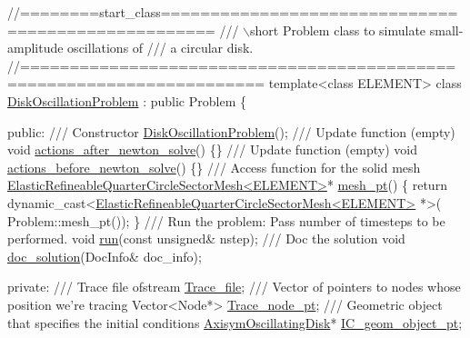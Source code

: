  
\begin{DoxyCodeInclude}
\textcolor{comment}{//========start\_class=================================================== }
\textcolor{comment}{/// \(\backslash\)short Problem class to simulate small-amplitude oscillations of }
\textcolor{comment}{}\textcolor{comment}{/// a circular disk.}
\textcolor{comment}{}\textcolor{comment}{//====================================================================== }
\textcolor{keyword}{template}<\textcolor{keyword}{class} ELEMENT>
\textcolor{keyword}{class }\hyperlink{classDiskOscillationProblem}{DiskOscillationProblem} : \textcolor{keyword}{public} Problem
\{

\textcolor{keyword}{public}:
\textcolor{comment}{}
\textcolor{comment}{ /// Constructor}
\textcolor{comment}{} \hyperlink{classDiskOscillationProblem_a5ce89d95d655d8c5b579171c8e9a54b9}{DiskOscillationProblem}();
\textcolor{comment}{}
\textcolor{comment}{ /// Update function (empty)}
\textcolor{comment}{} \textcolor{keywordtype}{void} \hyperlink{classDiskOscillationProblem_a84fdc4311e8cc1fa5f80dc5568c88413}{actions\_after\_newton\_solve}() \{\}
\textcolor{comment}{}
\textcolor{comment}{ /// Update function (empty)}
\textcolor{comment}{} \textcolor{keywordtype}{void} \hyperlink{classDiskOscillationProblem_afea297af1844657099dec3d717fcccc5}{actions\_before\_newton\_solve}() \{\}
\textcolor{comment}{}
\textcolor{comment}{ /// Access function for the solid mesh}
\textcolor{comment}{} \hyperlink{classElasticRefineableQuarterCircleSectorMesh}{ElasticRefineableQuarterCircleSectorMesh<ELEMENT>}* 
      \hyperlink{classDiskOscillationProblem_a9de851f400e5c161c5abf8efb2f2b082}{mesh\_pt}() 
  \{
   \textcolor{keywordflow}{return} \textcolor{keyword}{dynamic\_cast<}\hyperlink{classElasticRefineableQuarterCircleSectorMesh}{ElasticRefineableQuarterCircleSectorMesh<ELEMENT>}
      *\textcolor{keyword}{>}(
    Problem::mesh\_pt());
  \} 
\textcolor{comment}{}
\textcolor{comment}{ /// Run the problem: Pass number of timesteps to be performed.}
\textcolor{comment}{} \textcolor{keywordtype}{void} \hyperlink{classDiskOscillationProblem_ac0f7b36ffffa73ee49bc95bd961835dd}{run}(\textcolor{keyword}{const} \textcolor{keywordtype}{unsigned}& nstep);
 \textcolor{comment}{}
\textcolor{comment}{ /// Doc the solution}
\textcolor{comment}{} \textcolor{keywordtype}{void} \hyperlink{classDiskOscillationProblem_adf6e2bf1843d5f5e3fa7b2fc5fb129a8}{doc\_solution}(DocInfo& doc\_info);

\textcolor{keyword}{private}:
\textcolor{comment}{}
\textcolor{comment}{ /// Trace file}
\textcolor{comment}{} ofstream \hyperlink{classDiskOscillationProblem_a45a4b574c10c6416b3b6be950713f505}{Trace\_file};
 \textcolor{comment}{}
\textcolor{comment}{ /// Vector of pointers to nodes whose position we're tracing}
\textcolor{comment}{} Vector<Node*> \hyperlink{classDiskOscillationProblem_a141a79f41b33b19a6fca57793836e4da}{Trace\_node\_pt};
\textcolor{comment}{}
\textcolor{comment}{ /// Geometric object that specifies the initial conditions}
\textcolor{comment}{} \hyperlink{classAxisymOscillatingDisk}{AxisymOscillatingDisk}* \hyperlink{classDiskOscillationProblem_a338517a04848bb75252751df32879e40}{IC\_geom\_object\_pt};


\end{DoxyCodeInclude}
